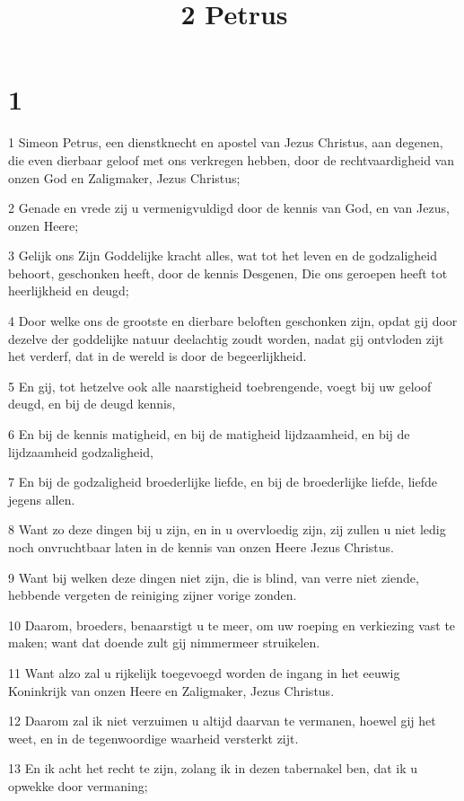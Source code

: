 

\title{2 Petrus}



\chapter{1}

\par 1 Simeon Petrus, een dienstknecht en apostel van Jezus Christus, aan degenen, die even dierbaar geloof met ons verkregen hebben, door de rechtvaardigheid van onzen God en Zaligmaker, Jezus Christus;
\par 2 Genade en vrede zij u vermenigvuldigd door de kennis van God, en van Jezus, onzen Heere;
\par 3 Gelijk ons Zijn Goddelijke kracht alles, wat tot het leven en de godzaligheid behoort, geschonken heeft, door de kennis Desgenen, Die ons geroepen heeft tot heerlijkheid en deugd;
\par 4 Door welke ons de grootste en dierbare beloften geschonken zijn, opdat gij door dezelve der goddelijke natuur deelachtig zoudt worden, nadat gij ontvloden zijt het verderf, dat in de wereld is door de begeerlijkheid.
\par 5 En gij, tot hetzelve ook alle naarstigheid toebrengende, voegt bij uw geloof deugd, en bij de deugd kennis,
\par 6 En bij de kennis matigheid, en bij de matigheid lijdzaamheid, en bij de lijdzaamheid godzaligheid,
\par 7 En bij de godzaligheid broederlijke liefde, en bij de broederlijke liefde, liefde jegens allen.
\par 8 Want zo deze dingen bij u zijn, en in u overvloedig zijn, zij zullen u niet ledig noch onvruchtbaar laten in de kennis van onzen Heere Jezus Christus.
\par 9 Want bij welken deze dingen niet zijn, die is blind, van verre niet ziende, hebbende vergeten de reiniging zijner vorige zonden.
\par 10 Daarom, broeders, benaarstigt u te meer, om uw roeping en verkiezing vast te maken; want dat doende zult gij nimmermeer struikelen.
\par 11 Want alzo zal u rijkelijk toegevoegd worden de ingang in het eeuwig Koninkrijk van onzen Heere en Zaligmaker, Jezus Christus.
\par 12 Daarom zal ik niet verzuimen u altijd daarvan te vermanen, hoewel gij het weet, en in de tegenwoordige waarheid versterkt zijt.
\par 13 En ik acht het recht te zijn, zolang ik in dezen tabernakel ben, dat ik u opwekke door vermaning;
